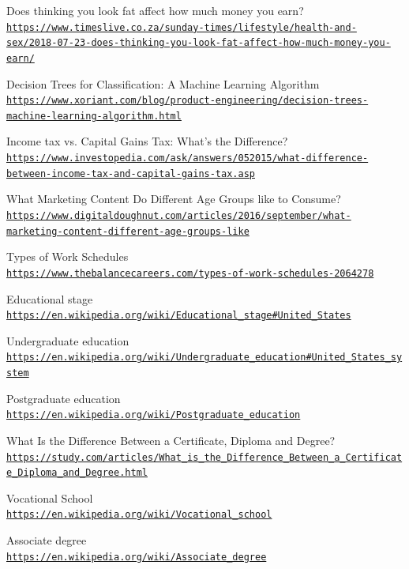 \documentclass[12pt]{article}
\begin{document}
	\begin{thebibliography}{9}
		Does thinking you look fat affect how much money you earn?
		\\\texttt{\url{https://www.timeslive.co.za/sunday-times/lifestyle/health-and-sex/2018-07-23-does-thinking-you-look-fat-affect-how-much-money-you-earn/}}
		
		Decision Trees for Classification: A Machine Learning Algorithm
		\\\texttt{\url{https://www.xoriant.com/blog/product-engineering/decision-trees-machine-learning-algorithm.html}}
		
		Income tax vs. Capital Gains Tax: What's the Difference?
		\\\texttt{\url{https://www.investopedia.com/ask/answers/052015/what-difference-between-income-tax-and-capital-gains-tax.asp}}
		
		What Marketing Content Do Different Age Groups like to Consume?
		\\\texttt{\url{https://www.digitaldoughnut.com/articles/2016/september/what-marketing-content-different-age-groups-like}}
		
		Types of Work Schedules
		\\\texttt{\url{https://www.thebalancecareers.com/types-of-work-schedules-2064278}}
		
		Educational stage
		\\\texttt{\url{https://en.wikipedia.org/wiki/Educational_stage\#United_States}}
		
		Undergraduate education
		\\\texttt{\url{https://en.wikipedia.org/wiki/Undergraduate_education\#United_States_system}}
		
		Postgraduate education
		\\\texttt{\url{https://en.wikipedia.org/wiki/Postgraduate_education}}
		
		What Is the Difference Between a Certificate, Diploma and Degree?
		\\\texttt{\url{https://study.com/articles/What_is_the_Difference_Between_a_Certificate_Diploma_and_Degree.html}}
		
		Vocational School
		\\\texttt{\url{https://en.wikipedia.org/wiki/Vocational_school}}
		
		Associate degree
		\\\texttt{\url{https://en.wikipedia.org/wiki/Associate_degree}}
	\end{thebibliography}
	
\end{document}

